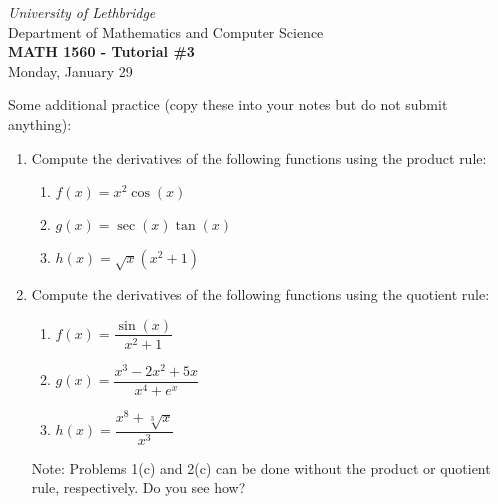 \documentclass[12pt]{article}
\newcommand{\skipline}{\vspace{12pt}}
\begin{document}
\author{Instructor: Sean Fitzpatrick}
\thispagestyle{empty}
\begin{center}
\emph{University of Lethbridge}\\
Department of Mathematics and Computer Science\\
{\bf MATH 1560 - Tutorial \#3}\\
Monday, January 29
\end{center}
\skipline \skipline \skipline \noindent \skipline

\vspace*{\fill}



Some additional practice (copy these into your notes but do not submit anything):
\begin{enumerate}
\item Compute the derivatives of the following functions using the product rule:
\begin{multicols}{3}
\begin{enumerate}
\item $f(x) = x^2\cos(x)$
\item $g(x) = \sec(x)\tan(x)$
\item $h(x) = \sqrt{x}(x^2+1)$ 
\end{enumerate}
\end{multicols}

\item Compute the derivatives of the following functions using the quotient rule:
\begin{multicols}{3}
\begin{enumerate}
\item $f(x) = \dfrac{\sin(x)}{x^2+1}$
\item $g(x) = \dfrac{x^3-2x^2+5x}{x^4+e^x}$
\item $h(x) = \dfrac{x^8+\sqrt[3]{x}}{x^3}$
\end{enumerate}
\end{multicols}
Note: Problems 1(c) and 2(c) can be done without the product or quotient rule, respectively. Do you see how?
\end{enumerate}




\newpage

\end{document}
